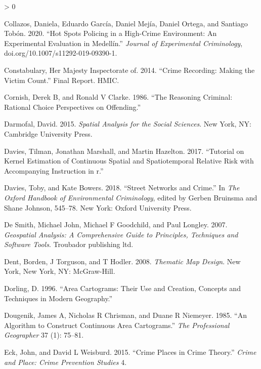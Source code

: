 \documentclass[
  krantz2]{krantz}
\newlength{\cslhangindent}
\newenvironment{CSLReferences}[2] %
 {%
  \setlength{\parindent}{0pt}
  \ifodd #1 \everypar{\setlength{\hangindent}{\cslhangindent}}\ignorespaces\fi
  \ifnum #2 > 0
  \setlength{\parskip}{#2\baselineskip}
  \fi
 }%
 {}
\begin{document}
\begin{CSLReferences}{1}{0}
\leavevmode\hypertarget{ref-Collazos_2020}{}%
Collazos, Daniela, Eduardo García, Daniel Mejía, Daniel Ortega, and Santiago Tobón. 2020. {``Hot Spots Policing in a High-Crime Environment: An Experimental Evaluation in Medellín.''} \emph{Journal of Experimental Criminology}, doi.org/10.1007/s11292-019-09390-1.

\leavevmode\hypertarget{ref-HMIC_2014}{}%
Constabulary, Her Majesty Inspectorate of. 2014. {``Crime Recording: Making the Victim Count.''} Final Report. HMIC.

\leavevmode\hypertarget{ref-Cornish_1986}{}%
Cornish, Derek B, and Ronald V Clarke. 1986. {``The Reasoning Criminal: Rational Choice Perspectives on Offending.''}

\leavevmode\hypertarget{ref-Darmofal_2015}{}%
Darmofal, David. 2015. \emph{Spatial Analysis for the Social Sciences}. New York, NY: Cambridge University Press.

\leavevmode\hypertarget{ref-Davies_2017}{}%
Davies, Tilman, Jonathan Marshall, and Martin Hazelton. 2017. {``Tutorial on Kernel Estimation of Continuous Spatial and Spatiotemporal Relative Risk with Accompanying Instruction in r.''}

\leavevmode\hypertarget{ref-Davies_2018}{}%
Davies, Toby, and Kate Bowers. 2018. {``Street Networks and Crime.''} In \emph{The Oxford Handbook of Environmental Criminology}, edited by Gerben Bruinsma and Shane Johnson, 545--78. New York: Oxford University Press.

\leavevmode\hypertarget{ref-DeSmith_2007}{}%
De Smith, Michael John, Michael F Goodchild, and Paul Longley. 2007. \emph{Geospatial Analysis: A Comprehensive Guide to Principles, Techniques and Software Tools}. Troubador publishing ltd.

\leavevmode\hypertarget{ref-Dent_2008}{}%
Dent, Borden, J Torguson, and T Hodler. 2008. \emph{Thematic Map Design}. New York, New York, NY: McGraw-Hill.

\leavevmode\hypertarget{ref-Dorling_1996}{}%
Dorling, D. 1996. {``Area Cartograms: Their Use and Creation, Concepts and Techniques in Modern Geography.''}

\leavevmode\hypertarget{ref-Dougenik_1985}{}%
Dougenik, James A, Nicholas R Chrisman, and Duane R Niemeyer. 1985. {``An Algorithm to Construct Continuous Area Cartograms.''} \emph{The Professional Geographer} 37 (1): 75--81.

\leavevmode\hypertarget{ref-Eck_2015}{}%
Eck, John, and David L Weisburd. 2015. {``Crime Places in Crime Theory.''} \emph{Crime and Place: Crime Prevention Studies} 4.


\end{CSLReferences}
\end{document}
